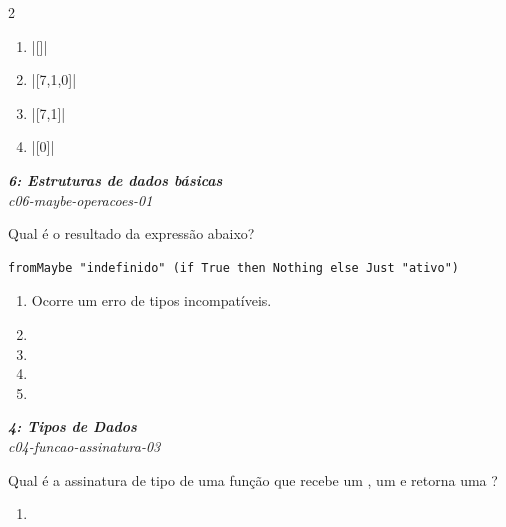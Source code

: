 \documentclass[a4paper,10pt,brazil]{article}
\begin{document}
\begin{multicols}{2}
\begin{enumerate}
  \item \haskellinline|[]|

  \item \haskellinline|[7,1,0]|

  \item \haskellinline|[7,1]|

  \item \haskellinline|[0]|


\end{enumerate}

\begin{flushright}
  \footnotesize
  \textit{\textbf{6: Estruturas de dados básicas}}\\
  \textit{c06-maybe-operacoes-01}\\

\end{flushright}
Qual é o resultado da expressão abaixo?
\begin{verbatim}
fromMaybe "indefinido" (if True then Nothing else Just "ativo")
\end{verbatim}

\begin{enumerate}
  \item Ocorre um erro de tipos incompatíveis.

  \item {}

  \item {}

  \item {}

  \item {}


\end{enumerate}

\begin{flushright}
  \footnotesize
  \textit{\textbf{4: Tipos de Dados}}\\
  \textit{c04-funcao-assinatura-03}\\

\end{flushright}
Qual é a assinatura de tipo de uma função que recebe um , um  e retorna uma ?

\begin{enumerate}
  \item {}


\end{enumerate}
\end{multicols}
\end{document}

